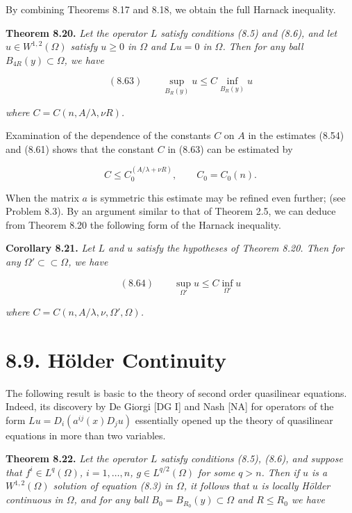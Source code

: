 By combining Theorems 8.17 and 8.18, we obtain the full Harnack inequality.

\medskip

\noindent\textbf{Theorem 8.20.} \textit{Let the operator $L$ satisfy conditions (8.5) and (8.6), and let
$u\in W^{1,2}(\Omega)$ satisfy $u\ge 0$ in $\Omega$ and $Lu=0$ in $\Omega$. Then for any ball $B_{4R}(y)\subset\Omega$, we have}

\[
(8.63)\qquad \sup_{B_R(y)} u \le C \inf_{B_R(y)} u
\]

\noindent\textit{where $C=C(n, A/\lambda, \nu R)$.}

\medskip

Examination of the dependence of the constants $C$ on $A$ in the estimates (8.54)
and (8.61) shows that the constant $C$ in (8.63) can be estimated by

\[
C\le C_0^{(A/\lambda+\nu R)}, \qquad C_0=C_0(n).
\]

When the matrix $a$ is symmetric this estimate may be refined even further; (see
Problem 8.3). By an argument similar to that of Theorem 2.5, we can deduce from
Theorem 8.20 the following form of the Harnack inequality.

\medskip

\noindent\textbf{Corollary 8.21.} \textit{Let $L$ and $u$ satisfy the hypotheses of Theorem 8.20. Then for any
$\Omega' \subset \subset \Omega$, we have}

\[
(8.64)\qquad \sup_{\Omega'} u \le C \inf_{\Omega'} u
\]

\noindent\textit{where $C=C(n, A/\lambda, \nu, \Omega', \Omega)$.}



\section*{8.9. H\"older Continuity}

The following result is basic to the theory of second order quasilinear equations.
Indeed, its discovery by De Giorgi [DG I] and Nash [NA] for operators of the
form $Lu = D_i(a^{ij}(x)D_j u)$ essentially opened up the theory of quasilinear equations
in more than two variables.

\medskip

\noindent\textbf{Theorem 8.22.} \emph{Let the operator $L$ satisfy conditions (8.5), (8.6), and suppose that
$f^i \in L^q(\Omega)$, $i=1,\dots,n$, $g \in L^{q/2}(\Omega)$ for some $q>n$. Then if $u$ is a $W^{1,2}(\Omega)$ solution of
equation (8.3) in $\Omega$, it follows that $u$ is locally H\"older continuous in $\Omega$, and for any
ball $B_0 = B_{R_0}(y) \subset \Omega$ and $R \le R_0$ we have}

